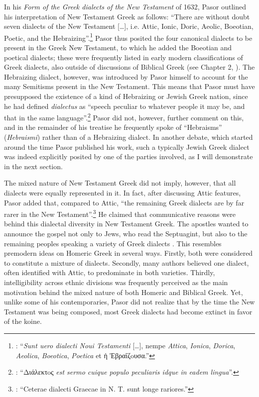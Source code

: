 In his \textit{Form of the Greek dialects of the New Testament} of 1632, Pasor outlined his interpretation of New Testament Greek as follows: “There are without doubt seven dialects of the New Testament […], i.e. Attic, Ionic, Doric, Aeolic, Boeotian, Poetic, and the Hebraizing”.\footnote{\citet[1-2]{Pasor1632}: “\textit{Sunt uero dialecti Noui Testamenti} […], nempe \textit{Attica}, \textit{Ionica}, \textit{Dorica}, \textit{Aeolica}, \textit{Boeotica}, \textit{Poetica} et ἡ Ἑβραΐζoυσα.”} Pasor thus posited the four canonical dialects to be present in the Greek New Testament, to which he added the Boeotian and poetical dialects; these were frequently listed in early modern classifications of Greek dialects, also outside of discussions of Biblical Greek (see Chapter 2, ). The Hebraizing dialect, however, was introduced by Pasor himself to account for the many Semitisms present in the New Testament. This means that Pasor must have presupposed the existence of a kind of Hebraizing or Jewish Greek nation, since he had defined \textit{dialectus} as “speech peculiar to whatever people it may be, and that in the same language”.\footnote{\citet[1]{Pasor1632}: “Διάλεκτoς \textit{est sermo cuique populo peculiaris idque in eadem lingua}”.} Pasor did not, however, further comment on this, and in the remainder of his treatise he frequently spoke of “Hebraisms” (\textit{Hebraismi}) rather than of a Hebraizing dialect. In another debate, which started around the time Pasor published his work, such a typically Jewish Greek dialect was indeed explicitly posited by one of the parties involved, as I will demonstrate in the next section.

The mixed nature of New Testament Greek did not imply, however, that all dialects were equally represented in it. In fact, after discussing Attic features, Pasor added that, compared to Attic, “the remaining Greek dialects are by far rarer in the New Testament”.\footnote{\citet[24]{Pasor1632}: “Ceterae dialecti Graecae in N. T. sunt longe rariores.”} He claimed that communicative reasons were behind this dialectal diversity in New Testament Greek. The apostles wanted to announce the gospel not only to Jews, who read the Septuagint, but also to the remaining peoples speaking a variety of Greek dialects \citep[143]{Pasor1650}. This resembles premodern ideas on Homeric Greek in several ways. Firstly, both were considered to constitute a mixture of dialects. Secondly, many authors believed one dialect, often identified with Attic, to predominate in both varieties. Thirdly, intelligibility across ethnic divisions was frequently perceived as the main motivation behind the mixed nature of both Homeric and Biblical Greek. Yet, unlike some of his contemporaries, Pasor did not realize that by the time the New Testament was being composed, most Greek dialects had become extinct in favor of the koine.

